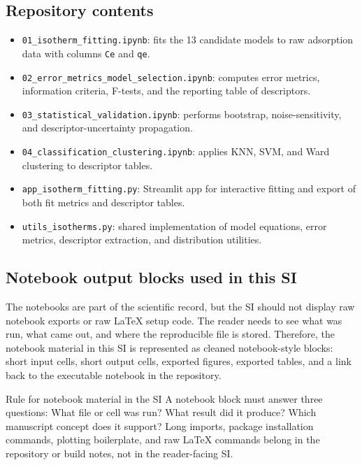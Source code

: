 \documentclass[journal=jacsat,manuscript=article]{achemso}
\begin{document}
\subsection{Repository contents}
\label{sec:si_notebook_contents}

\begin{itemize}
	\item \texttt{01\_isotherm\_fitting.ipynb}: fits the 13 candidate models to
	raw adsorption data with columns \texttt{Ce} and \texttt{qe}.
	\item \texttt{02\_error\_metrics\_model\_selection.ipynb}: computes error
	metrics, information criteria, F-tests, and the reporting table of
	descriptors.
	\item \texttt{03\_statistical\_validation.ipynb}: performs bootstrap,
	noise-sensitivity, and descriptor-uncertainty propagation.
	\item \texttt{04\_classification\_clustering.ipynb}: applies KNN, SVM, and
	Ward clustering to descriptor tables.
	\item \texttt{app\_isotherm\_fitting.py}: Streamlit app for interactive fitting
	and export of both fit metrics and descriptor tables.
	\item \texttt{utils\_isotherms.py}: shared implementation of model equations,
	error metrics, descriptor extraction, and distribution utilities.
\end{itemize}

\subsection{Notebook output blocks used in this SI}
\label{sec:si_notebook_latex_export}

The notebooks are part of the scientific record, but the SI should not display
raw notebook exports or raw \LaTeX{} setup code. The reader needs to see what was
run, what came out, and where the reproducible file is stored. Therefore, the
notebook material in this SI is represented as cleaned notebook-style blocks:
short input cells, short output cells, exported figures, exported tables, and a
link back to the executable notebook in the repository.

\begin{greenbox}{Rule for notebook material in the SI}
	A notebook block must answer three questions: What file or cell was run? What
	result did it produce? Which manuscript concept does it support? Long imports,
	package installation commands, plotting boilerplate, and raw \LaTeX{} commands
	belong in the repository or build notes, not in the reader-facing SI.
\end{greenbox}
\end{document}
